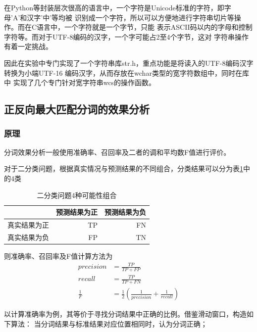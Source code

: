 在Python等封装层次很高的语言中，一个字符是Unicode标准的字符，即字母'A'和汉字'中'等均被
识别成一个字符，所以可以方便地进行字符串切片等操作。而在C语言中，一个字符就是一个字节，只能
表示ASCII码以内的字母和控制字符等。而对于UTF-8编码的汉字，一个字可能占2至4个字节，这对
字符串操作有着一定挑战。

因此在实验中专门实现了一个字符串库str.h，重点功能是将读入的UTF-8编码汉字转换为小端UTF-16
编码\citep{garfinkel2013detecting}汉字，从而存放在wchar类型的宽字符数组中，同时在库中
实现了几个专门针对宽字符串wcs的操作函数。

\subsection{正反向最大匹配分词的效果分析}

\subsubsection{原理}

分词效果分析一般使用准确率、召回率及二者的调和平均数F值进行评价。

对于二分类问题，根据真实情况与预测结果的不同组合，分类结果可以分为表\ref{TPFPFNTN}中的4类
\begin{table}[H]
  \centering
  \begin{tabular}{rrr}
    \hline
    \textbf{}    & \textbf{预测结果为正} & \textbf{预测结果为负} \\
    \hline
    真实结果为正 & TP                    & FN                    \\
    真实结果为负 & FP                    & TN                    \\
    \hline
  \end{tabular}
  \caption{二分类问题4种可能性组合}
  \label{TPFPFNTN}
\end{table}

则准确率、召回率及F值计算方法为
\begin{align}
  precision   & = \frac{TP}{TP + FP}                                            \\
  recall      & = \frac{TP}{TP + FN}                                            \\
  \frac{1}{F} & = \frac{1}{2} \left(\frac{1}{precision}+\frac{1}{recall}\right)
\end{align}

以计算准确率为例，其等价于寻找分词结果中正确的比例。借鉴滑动窗口，构造如下算法：
当分词结果与标准结果对应位置相同时，认为分词正确；

